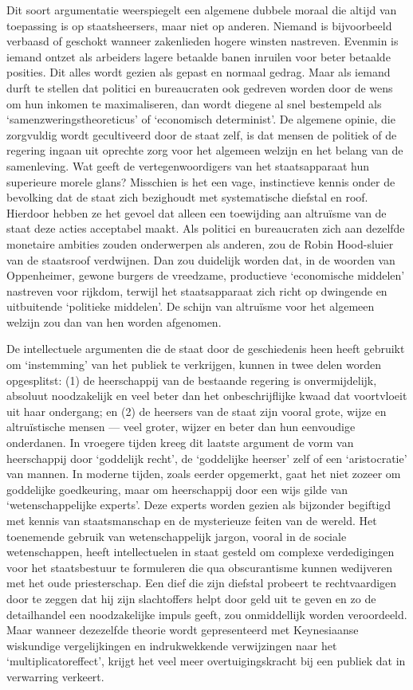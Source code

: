 \documentclass[
  a5paper,
  smalldemyvopaper,10pt,twoside,onecolumn,openright,extrafontsizes,hidelinks]{memoir}
\begin{document}
Dit soort argumentatie weerspiegelt een algemene dubbele moraal die
altijd van toepassing is op staatsheersers, maar niet op anderen.
Niemand is bijvoorbeeld verbaasd of geschokt wanneer zakenlieden hogere
winsten nastreven. Evenmin is iemand ontzet als arbeiders lagere
betaalde banen inruilen voor beter betaalde posities. Dit alles wordt
gezien als gepast en normaal gedrag. Maar als iemand durft te stellen
dat politici en bureaucraten ook gedreven worden door de wens om hun
inkomen te maximaliseren, dan wordt diegene al snel bestempeld als
`samenzweringstheoreticus' of `economisch determinist'. De algemene
opinie, die zorgvuldig wordt gecultiveerd door de staat zelf, is dat
mensen de politiek of de regering ingaan uit oprechte zorg voor het
algemeen welzijn en het belang van de samenleving. Wat geeft de
vertegenwoordigers van het staatsapparaat hun superieure morele glans?
Misschien is het een vage, instinctieve kennis onder de bevolking dat de
staat zich bezighoudt met systematische diefstal en roof. Hierdoor
hebben ze het gevoel dat alleen een toewijding aan altruïsme van de
staat deze acties acceptabel maakt. Als politici en bureaucraten zich
aan dezelfde monetaire ambities zouden onderwerpen als anderen, zou de
Robin Hood-sluier van de staatsroof verdwijnen. Dan zou duidelijk worden
dat, in de woorden van Oppenheimer, gewone burgers de vreedzame,
productieve `economische middelen' nastreven voor rijkdom, terwijl het
staatsapparaat zich richt op dwingende en uitbuitende `politieke
middelen'. De schijn van altruïsme voor het algemeen welzijn zou dan van
hen worden afgenomen.

De intellectuele argumenten die de staat door de geschiedenis heen heeft
gebruikt om `instemming' van het publiek te verkrijgen, kunnen in twee
delen worden opgesplitst: (1) de heerschappij van de bestaande regering
is onvermijdelijk, absoluut noodzakelijk en veel beter dan het
onbeschrijflijke kwaad dat voortvloeit uit haar ondergang; en (2) de
heersers van de staat zijn vooral grote, wijze en altruïstische mensen
--- veel groter, wijzer en beter dan hun eenvoudige onderdanen. In
vroegere tijden kreeg dit laatste argument de vorm van heerschappij door
`goddelijk recht', de `goddelijke heerser' zelf of een `aristocratie'
van mannen. In moderne tijden, zoals eerder opgemerkt, gaat het niet
zozeer om goddelijke goedkeuring, maar om heerschappij door een wijs
gilde van `wetenschappelijke experts'. Deze experts worden gezien als
bijzonder begiftigd met kennis van staatsmanschap en de mysterieuze
feiten van de wereld. Het toenemende gebruik van wetenschappelijk
jargon, vooral in de sociale wetenschappen, heeft intellectuelen in
staat gesteld om complexe verdedigingen voor het staatsbestuur te
formuleren die qua obscurantisme kunnen wedijveren met het oude
priesterschap. Een dief die zijn diefstal probeert te rechtvaardigen
door te zeggen dat hij zijn slachtoffers helpt door geld uit te geven en
zo de detailhandel een noodzakelijke impuls geeft, zou onmiddellijk
worden veroordeeld. Maar wanneer dezezelfde theorie wordt gepresenteerd
met Keynesiaanse wiskundige vergelijkingen en indrukwekkende
verwijzingen naar het `multiplicatoreffect', krijgt het veel meer
overtuigingskracht bij een publiek dat in verwarring verkeert.
\end{document}
